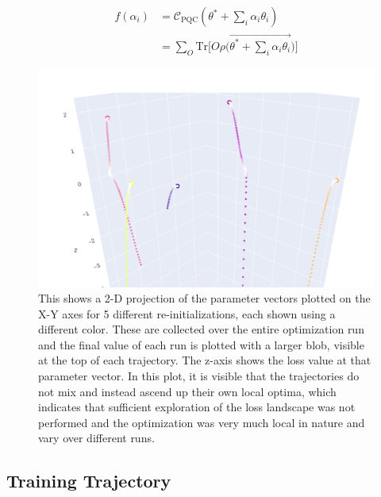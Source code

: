 \begin{equation}\label{qleet-eqn:loss-landscape-plot}
    \begin{split}
        f(\alpha_i) 
        &= \mathcal{C}_{\text{PQC}}(\theta^* + \sum_i \alpha_i \theta_i) \\ 
        &= \sum_{O} \text{Tr}\Bigg[O\rho \bigg(\vec{\theta^* + \sum_i \alpha_i \theta_i} \bigg) \Bigg]
    \end{split}
\end{equation}

\begin{figure}[!tp]
    \centering
    \includegraphics[width=\linewidth]{figures/qleet/training-trajectories.pdf}
    \caption[Parameters in from several Training Trajectories]{This shows a 2-D projection of the parameter vectors plotted on the X-Y axes for 5 different re-initializations, each shown using a different color. These are collected over the entire optimization run and the final value of each run is plotted with a larger blob, visible at the top of each trajectory. The z-axis shows the loss value at that parameter vector. In this plot, it is visible that the trajectories do not mix and instead ascend up their own local optima, which indicates that sufficient exploration of the loss landscape was not performed and the optimization was very much local in nature and vary over different runs.}
    \label{qleet-fig:training-trajectories}
\end{figure}

\subsection{Training Trajectory}

